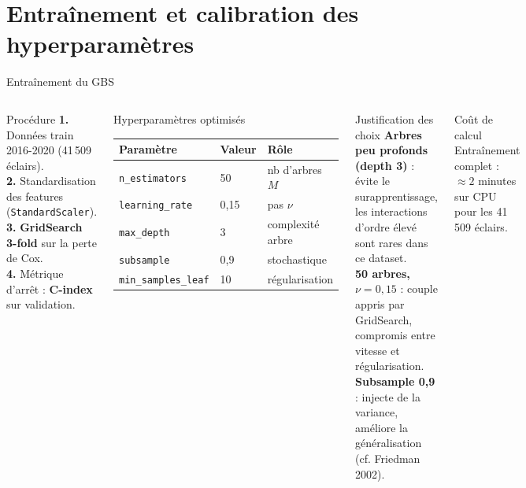 \documentclass[aspectratio=169,t,11pt]{beamer}
\begin{document}
\section{Entraînement et calibration des hyperparamètres}

\begin{frame}{Entraînement du GBS}
\vspace{-2pt}
\begin{columns}[T]

\begin{block}{Procédure}
\small
\textbf{1.} Données train 2016-2020 (41\,509 éclairs).\\
\textbf{2.} Standardisation des features (\texttt{StandardScaler}).\\
\textbf{3.} \textbf{GridSearch 3-fold} sur la perte de Cox.\\
\textbf{4.} Métrique d'arrêt : \textbf{C-index} sur validation.
\end{block}
\vspace{4pt}
\begin{block}{Hyperparamètres optimisés}
\footnotesize
\begin{tabular}{lll}
\toprule
\textbf{Paramètre} & \textbf{Valeur} & \textbf{Rôle} \\
\midrule
\texttt{n\_estimators}     & 50   & nb d'arbres $M$ \\
\texttt{learning\_rate}    & 0,15 & pas $\nu$ \\
\texttt{max\_depth}        & 3    & complexité arbre \\
\texttt{subsample}         & 0,9  & stochastique \\
\texttt{min\_samples\_leaf}& 10   & régularisation \\
\bottomrule
\end{tabular}
\end{block}

\begin{exampleblock}{Justification des choix}
\small
\textbf{Arbres peu profonds (depth 3)} : évite le surapprentissage,
les interactions d'ordre élevé sont rares dans ce dataset.\\[3pt]
\textbf{50 arbres, $\nu = 0{,}15$} : couple appris par GridSearch,
compromis entre vitesse et régularisation.\\[3pt]
\textbf{Subsample 0,9} : injecte de la variance, améliore la
généralisation (cf. Friedman 2002).
\end{exampleblock}
\vspace{4pt}
\begin{alertblock}{Coût de calcul}
\footnotesize
Entraînement complet : $\approx 2$ minutes sur CPU pour les 41\,509 éclairs.
\end{alertblock}
\end{columns}
\end{frame}
\end{document}
